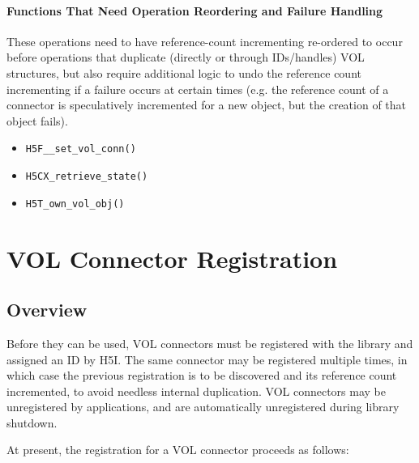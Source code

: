\documentclass{article}
\begin{document}
\paragraph{Functions That Need Operation Reordering and Failure Handling}

These operations need to have reference-count incrementing re-ordered to occur before operations that duplicate (directly or through IDs/handles) VOL structures, but also require additional logic to undo the reference count incrementing if a failure occurs at certain times (e.g. the reference count of a connector is speculatively incremented for a new object, but the creation of that object fails).

\begin{itemize}
    \item \texttt{H5F\_\_set\_vol\_conn()}

    \item \texttt{H5CX\_retrieve\_state()}

    \item \texttt{H5T\_own\_vol\_obj()}
\end{itemize}

\section{VOL Connector Registration}
\label{sec:registration}

\subsection{Overview}

Before they can be used, VOL connectors must be registered with the library and assigned an ID by H5I. The same connector may be registered multiple times, in which case the previous registration is to be discovered and its reference count incremented, to avoid needless internal duplication. VOL connectors may be unregistered by applications, and are automatically unregistered during library shutdown.


At present, the registration for a VOL connector proceeds as follows:
\end{document}
